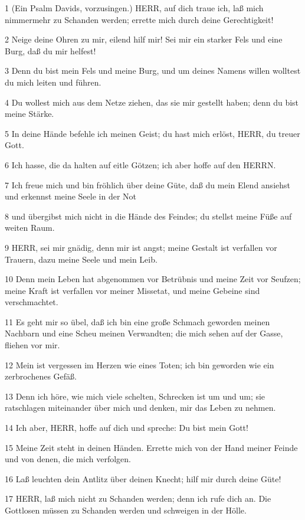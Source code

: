 \par 1 (Ein Psalm Davids, vorzusingen.) HERR, auf dich traue ich, laß mich nimmermehr zu Schanden werden; errette mich durch deine Gerechtigkeit!
\par 2 Neige deine Ohren zu mir, eilend hilf mir! Sei mir ein starker Fels und eine Burg, daß du mir helfest!
\par 3 Denn du bist mein Fels und meine Burg, und um deines Namens willen wolltest du mich leiten und führen.
\par 4 Du wollest mich aus dem Netze ziehen, das sie mir gestellt haben; denn du bist meine Stärke.
\par 5 In deine Hände befehle ich meinen Geist; du hast mich erlöst, HERR, du treuer Gott.
\par 6 Ich hasse, die da halten auf eitle Götzen; ich aber hoffe auf den HERRN.
\par 7 Ich freue mich und bin fröhlich über deine Güte, daß du mein Elend ansiehst und erkennst meine Seele in der Not
\par 8 und übergibst mich nicht in die Hände des Feindes; du stellst meine Füße auf weiten Raum.
\par 9 HERR, sei mir gnädig, denn mir ist angst; meine Gestalt ist verfallen vor Trauern, dazu meine Seele und mein Leib.
\par 10 Denn mein Leben hat abgenommen vor Betrübnis und meine Zeit vor Seufzen; meine Kraft ist verfallen vor meiner Missetat, und meine Gebeine sind verschmachtet.
\par 11 Es geht mir so übel, daß ich bin eine große Schmach geworden meinen Nachbarn und eine Scheu meinen Verwandten; die mich sehen auf der Gasse, fliehen vor mir.
\par 12 Mein ist vergessen im Herzen wie eines Toten; ich bin geworden wie ein zerbrochenes Gefäß.
\par 13 Denn ich höre, wie mich viele schelten, Schrecken ist um und um; sie ratschlagen miteinander über mich und denken, mir das Leben zu nehmen.
\par 14 Ich aber, HERR, hoffe auf dich und spreche: Du bist mein Gott!
\par 15 Meine Zeit steht in deinen Händen. Errette mich von der Hand meiner Feinde und von denen, die mich verfolgen.
\par 16 Laß leuchten dein Antlitz über deinen Knecht; hilf mir durch deine Güte!
\par 17 HERR, laß mich nicht zu Schanden werden; denn ich rufe dich an. Die Gottlosen müssen zu Schanden werden und schweigen in der Hölle.
